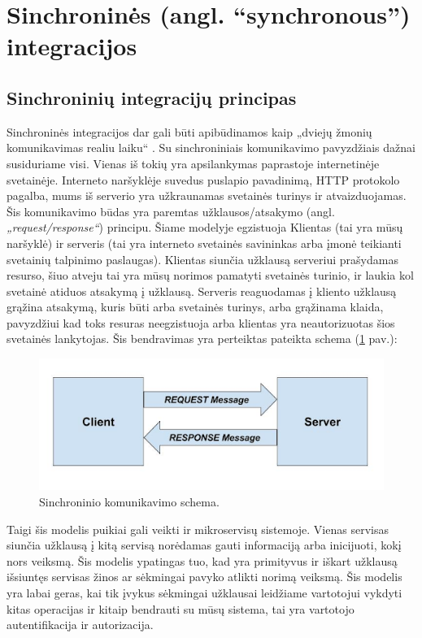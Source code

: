 \section{Sinchroninės (angl. “synchronous”) integracijos}

\subsection{Sinchroninių integracijų principas}
Sinchroninės integracijos dar gali būti apibūdinamos kaip „dviejų žmonių komunikavimas realiu laiku“ \cite{Bk6}. Su sinchroniniais komunikavimo pavyzdžiais dažnai susiduriame visi. Vienas iš tokių yra apsilankymas paprastoje internetinėje svetainėje.
Interneto naršyklėje suvedus puslapio pavadinimą, HTTP protokolo pagalba, mums iš serverio yra užkraunamas svetainės turinys ir atvaizduojamas.
Šis komunikavimo būdas yra paremtas užklausos/atsakymo (angl. \textit{„request/response“}) principu. Šiame modelyje egzistuoja
Klientas (tai yra mūsų naršyklė) ir serveris (tai yra interneto svetainės savininkas arba įmonė teikianti svetainių talpinimo paslaugas).
Klientas siunčia užklausą serveriui prašydamas resurso, šiuo atveju tai yra mūsų norimos pamatyti svetainės turinio, ir laukia kol svetainė atiduos atsakymą į užklausą.
Serveris reaguodamas į kliento užklausą grąžina atsakymą, kuris būti arba svetainės turinys, arba grąžinama klaida, pavyzdžiui kad toks resuras neegzistuoja arba 
klientas yra neautorizuotas šios svetainės lankytojas. Šis bendravimas yra perteiktas pateikta schema (\ref{img:synchronous_model} pav.):

\begin{figure}[H]
  \centering
  \includegraphics[scale=0.6]{img/synchronous_model}
  \caption{Sinchroninio komunikavimo schema.}
  \label{img:synchronous_model}
\end{figure}

Taigi šis modelis puikiai gali veikti ir mikroservisų sistemoje. Vienas servisas siunčia užklausą į kitą servisą norėdamas gauti
informaciją arba inicijuoti, kokį nors veiksmą. Šis modelis ypatingas tuo, kad yra primityvus ir iškart užklausą išsiuntęs servisas
žinos ar sėkmingai pavyko atlikti norimą veiksmą. Šis modelis yra labai geras, kai tik įvykus sėkmingai užklausai leidžiame vartotojui vykdyti
kitas operacijas ir kitaip bendrauti su mūsų sistema, tai yra vartotojo autentifikacija ir autorizacija.


